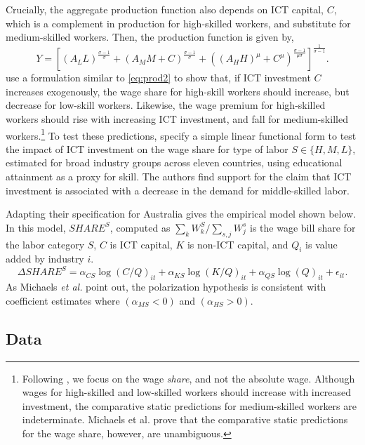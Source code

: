 Crucially, the aggregate production function also depends on ICT capital, $C$, which is a complement in production for high-skilled workers, and substitute for medium-skilled workers. Then, the production function is given by,
\begin{equation}  \label{eq:prod2}
Y = \left[
  \left(A_LL \right)^\frac{\sigma-1}{\sigma}
  +
  \left(A_MM + C\right)^\frac{\sigma-1}{\sigma}
  +
  \left((A_HH)^\mu + C^\mu\right)^\frac{\sigma-1}{\mu\sigma}
  \right]^\frac{1}{\sigma-1}.
\end{equation}
\citet{Michaels2010} use a formulation similar to \eqref{eq:prod2} to show that, if ICT investment $C$ increases exogenously, the wage share for high-skill workers should increase, but decrease for low-skill workers. Likewise, the wage premium for high-skilled workers should rise with increasing ICT investment, and fall for medium-skilled workers.\footnote{Following \citet{Michaels2010}, we focus on the wage {\em share}, and not the absolute wage. Although wages for high-skilled and low-skilled workers should increase with increased investment, the comparative static predictions for medium-skilled workers are indeterminate. Michaels et al. prove that the comparative static predictions for the wage share, however, are unambiguous.} To test these predictions, \citet{Michaels2010} specify a simple linear functional form to test the impact of ICT investment on the wage share for type of labor $S\in\{H,M,L\}$, estimated for broad industry groups across eleven countries, using educational attainment as a proxy for skill. The authors find support for the claim that ICT investment is associated with a decrease in the demand for middle-skilled labor. 

Adapting their specification for Australia gives the empirical model shown below. In this model, $SHARE^S$, computed as ${\sum_k W^S_k/\sum_{s,j}W^s_j}$ is the wage bill share for the labor category $S$, $C$ is ICT capital, $K$ is non-ICT capital, and $Q_i$ is value added by industry $i$. 
\begin{equation} \label{eq:translog}
\Delta SHARE^S = \alpha_{CS}\log(C/Q)_{it} + \alpha_{KS}\log(K/Q)_{it} + \alpha_{QS}\log(Q)_{it} + \epsilon_{it}.
\end{equation}
As Michaels {\it et al.} point out, the polarization hypothesis is consistent with coefficient estimates where $(\alpha_{MS}<0)$ and $(\alpha_{HS}>0)$.

\subsection{Data}


